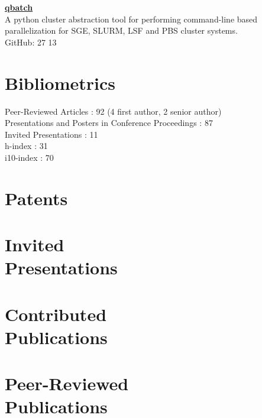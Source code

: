 \documentclass[margin1,line,canadian]{resume}
\begin{document}
\begin{resume}
\textbf{\href{https://github.com/CoBrALab/qbatch}{\color{black}qbatch}}\\%
A python cluster abstraction tool for performing command-line based parallelization for SGE, SLURM, LSF and PBS cluster systems.\\
GitHub: 27 \faStar{} 13 \faCodeFork

\section{\mysidestyle{}Bibliometrics}
Peer-Reviewed Articles : 92 (4 first author, 2 senior author)\\
Presentations and Posters in Conference Proceedings : 87\\
Invited Presentations : 11\\
h-index : 31\\
i10-index : 70

 \section{\mysidestyle{}Patents}
 \begin{refsection}
  \newrefcontext[sorting=ymdnt]
  \nocite{*}
  \printbibliography[heading=none]
 \end{refsection}
 \section{\mysidestyle{}Invited\\Presentations}
 \begin{refsection}
  \newrefcontext[sorting=ymdnt]
  \nocite{*}
  \printbibliography[heading=none]
 \end{refsection}
 \section{\mysidestyle{}Contributed\\Publications}
 \begin{refsection}
  \newrefcontext[sorting=ymdnt]
  \nocite{*}
  \printbibliography[heading=none]
 \end{refsection}
 \section{\mysidestyle{}Peer-Reviewed\\Publications}
 \begin{refsection}
  \newrefcontext[sorting=ymdnt]
  \nocite{*}
  \printbibliography[heading=none]
 \end{refsection}

\end{resume}
\end{document}
